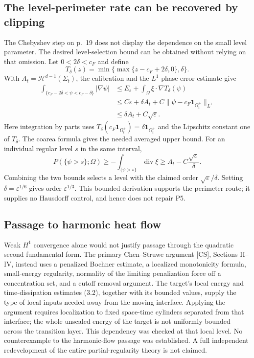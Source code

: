 \documentclass[10pt]{article}
\begin{document}
\subsection*{The level-perimeter rate can be recovered by clipping}
The Chebyshev step on p. 19 does not display the dependence on the small level parameter. The desired level-selection bound can be obtained without relying on that omission. Let \(0<2\delta<c_F\) and define \[T_\delta(z)=\min\{\max\{z-c_F+2\delta,0\},\delta\}.\] With \(A_t=\mathcal H^{d-1}(\Sigma_t)\), the calibration and the \(L^1\) phase-error estimate give \[\begin{aligned}
 \int_{\{c_F-2\delta<\psi<c_F-\delta\}}|\nabla\psi|
 &\leq E_\varepsilon+\int_\Omega\xi\cdot\nabla T_\delta(\psi)\\
 &\leq C\varepsilon+\delta A_t+C\|\psi-c_F\mathbf 1_{\Omega_t^+}\|_{L^1}\\
 &\leq \delta A_t+C\sqrt\varepsilon.\end{aligned}\] Here integration by parts uses \(T_\delta(c_F\mathbf 1_{\Omega_t^+})=\delta\mathbf 1_{\Omega_t^+}\) and the Lipschitz constant one of \(T_\delta\). The coarea formula gives the needed averaged upper bound. For an individual regular level \(s\) in the same interval, \[P(\{\psi>s\};\Omega)
 \geq-\int_{\{\psi>s\}}\operatorname{div}\xi
 \geq A_t-C\frac{\sqrt\varepsilon}{\delta}.\] Combining the two bounds selects a level with the claimed order \(\sqrt\varepsilon/\delta\). Setting \(\delta=\varepsilon^{1/6}\) gives order \(\varepsilon^{1/3}\). This bounded derivation supports the perimeter route; it supplies no Hausdorff control, and hence does not repair P5.\par
\subsection*{Passage to harmonic heat flow}
Weak \(H^1\) convergence alone would not justify passage through the quadratic second fundamental form. The primary Chen–Struwe argument [CS], Sections II–IV, instead uses a penalized Bochner estimate, a localized monotonicity formula, small-energy regularity, normality of the limiting penalization force off a concentration set, and a cutoff removal argument. The target’s local energy and time-dissipation estimates (3.2), together with its bounded values, supply the type of local inputs needed away from the moving interface. Applying the argument requires localization to fixed space-time cylinders separated from that interface; the whole unscaled energy of the target is not uniformly bounded across the transition layer. This dependency was checked at that local level. No counterexample to the harmonic-flow passage was established. A full independent redevelopment of the entire partial-regularity theory is not claimed.\par
\end{document}
